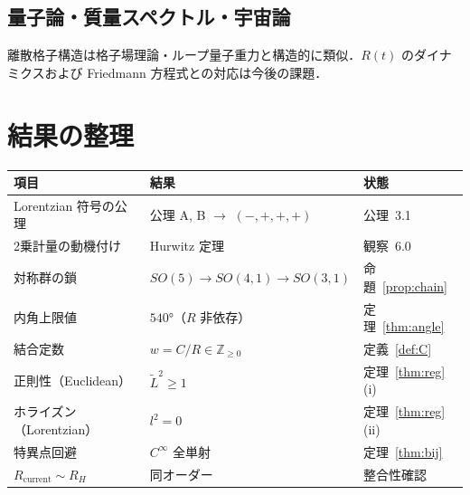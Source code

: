 \documentclass[12pt,a4paper]{ltjsarticle}
\begin{document}
\subsection{量子論・質量スペクトル・宇宙論}
離散格子構造は格子場理論・ループ量子重力と構造的に類似．$R(t)$ のダイナミクスおよび Friedmann 方程式との対応は今後の課題．

\section*{結果の整理}

\begin{center}
\begin{tabular}{lll}
\toprule
項目 & 結果 & 状態 \\
\midrule
Lorentzian 符号の公理 & 公理 A, B $\to$ $(-,+,+,+)$ & 公理~3.1 \\
2乗計量の動機付け & Hurwitz 定理 & 観察~6.0 \\
対称群の鎖 & $SO(5) \to SO(4,1) \to SO(3,1)$ & 命題~\ref{prop:chain} \\
内角上限値 & $540°$（$R$ 非依存） & 定理~\ref{thm:angle} \\
結合定数 & $w = C/R \in \mathbb{Z}_{\geq 0}$ & 定義~\ref{def:C} \\
正則性（Euclidean） & $\tilde{L}^2 \geq 1$ & 定理~\ref{thm:reg}(i) \\
ホライズン（Lorentzian） & $l^2 = 0$ & 定理~\ref{thm:reg}(ii) \\
特異点回避 & $C^\infty$ 全単射 & 定理~\ref{thm:bij} \\
$R_{\text{current}} \sim R_H$ & 同オーダー & 整合性確認 \\
\bottomrule
\end{tabular}
\end{center}
\end{document}
